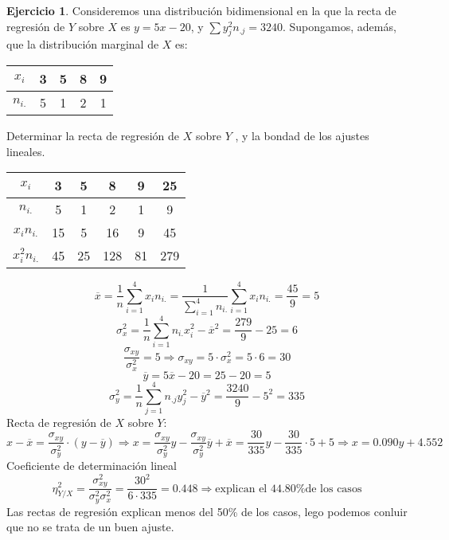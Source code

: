 \documentclass[a4paper, 12pt]{article}
\theoremstyle{definition}
\newtheorem{ej}{Ejercicio}
\begin{document}
\begin{ej}
Consideremos una distribución bidimensional en la que la recta de regresión de $Y$ sobre $X$ es $y=5x-20$, y $\sum y_j^2n_{.j} = 3240$. Supongamos, además, que la distribución marginal de $X$ es:

\begin{center}
\begin{tabular}{c|cccc}
    $x_i$ & 3 & 5 & 8 & 9 \\
    \hline
    $n_{i.}$ & 5 & 1 & 2 & 1 
\end{tabular}
\end{center}

Determinar la recta de regresión de $X$ sobre $Y$ , y la bondad de los ajustes lineales.

\begin{center}
\begin{tabular}{c|cccc|c}
    $x_i$ & 3 & 5 & 8 & 9 & 25 \\
    \hline
    $n_{i.}$ & 5 & 1 & 2 & 1 & 9\\
    \hline
    $x_in_{i.}$ & 15 &  5 & 16 & 9 & 45 \\
    \hline
    $x_i^2n_{i.}$ & 45 & 25 & 128 & 81 & 279 \\
\end{tabular}
\end{center}

\[
\overline{x} = \frac{1}{n}\sum_{i=1}^4x_in_{i.}= \frac{1}{\sum^4_{i=1}n_{i.}}\sum_{i=1}^4x_in_{i.}=\frac{45}{9} = 5
\]
\[
\sigma_x^2 = \frac{1}{n}\sum_{i=1}^4n_{i.}x_i^2 - \overline{x}^2 = \frac{279}{9} -25 = 6
\]
\[
\frac{\sigma_{xy}}{\sigma_x^2}=5 \Longrightarrow \sigma_{xy} = 5 \cdot\sigma_x^2= 5\cdot 6 = 30
\]
\[
\overline{y}=5\overline{x} -20 = 25-20 = 5
\]
\[
\sigma_y^2 = \frac{1}{n}\sum_{j=1}^4n_{.j}y_j^2 -\overline{y}^2 = \frac{3240}{9}-5^2 = 335
\]
Recta de regresión de $X$ sobre $Y$:
\[
x - \overline{x} = \frac{\sigma_{xy}}{\sigma_{y}^2} \cdot (y - \overline{y}) \Longrightarrow x=\frac{\sigma_{xy}}{\sigma_y^2}y-\frac{\sigma_{xy}}{\sigma_y^2}\overline{y}+\overline{x}= \frac{30}{335}y-\frac{30}{335}\cdot 5 + 5 \Longrightarrow x = 0.090y + 4.552
\]
Coeficiente de determinación lineal
\[
\eta_{Y/X}^{2} = \frac{\sigma_{xy}^2}{\sigma_y^2\sigma_x^2} = \frac{30^2}{6\cdot 335} = 0.448 \Longrightarrow \text{explican el 44.80\% de los casos}
\]
Las rectas de regresión explican menos del 50\% de los casos, lego podemos conluir que no se trata de un buen ajuste.

\end{ej}
\end{document}
